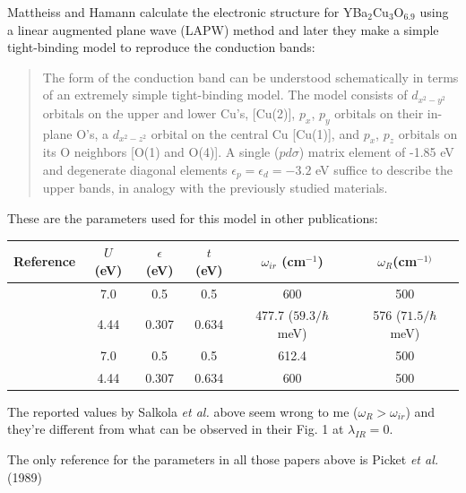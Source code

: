 Mattheiss and Hamann\cite{Mattheiss1987} calculate the electronic structure for YBa$_{2}$Cu$_{3}$O$_{6.9}$ using a linear augmented plane wave (LAPW) method and later they make a simple tight-binding model to reproduce the conduction bands:

\begin{quote}The form of the conduction band can be understood schematically in terms of an extremely simple tight-binding model. The model consists of $d_{x^2-y^2}$ orbitals on the upper and lower Cu's, [Cu(2)], $p_x$, $p_y$ orbitals on their in-plane O's, a $d_{x^2-z^2}$ orbital on the central Cu [Cu(1)], and $p_x$, $p_z$ orbitals on its O neighbors [O(1) and O(4)]. A single ($pd\sigma$) matrix element of -1.85 eV and degenerate diagonal elements $\epsilon_p = \epsilon_d=-3.2$ eV suffice to describe the upper bands, in analogy with the previously studied materials.
\end{quote}

These are the parameters used for this model in other publications:

\noindent\begin{tabular}{| l | c | c | c | c | c |}
\hline
Reference & $U$ (eV) & $\epsilon$ (eV) & $t$ (eV) & $\omega_{ir}$ (cm$^{-1}$) & $\omega_R$(cm$^{-1)}$ \\
\hline
\cite{MustredeLeon1992} & 7.0 & 0.5 & 0.5 & 600 & 500 \\ 
\cite{Salkola1994, Salkola1995} & 4.44 & 0.307 & 0.634 & 477.7 ($59.3/\hbar$ meV) & 576 ($71.5/\hbar$ meV) \\
\cite{MustredeLeon1999, MirandaMena2006, MustredeLeon2008, MirandaMena2007} & 7.0 & 0.5 & 0.5 & 612.4 & 500 \\ 
\cite{MustredeLeon2000} & 4.44 & 0.307 & 0.634 & 600 & 500 \\
\hline
\end{tabular}

The reported values by Salkola \textit{et al.}\cite{Salkola1994} \cite{Salkola1995} above seem wrong to me ($\omega_R > \omega_{ir}$) and they're different from what can be observed in their Fig. 1 at $\lambda_{IR}=0$.

The only reference for the parameters in all those papers above is Picket \textit{et al.} (1989)
